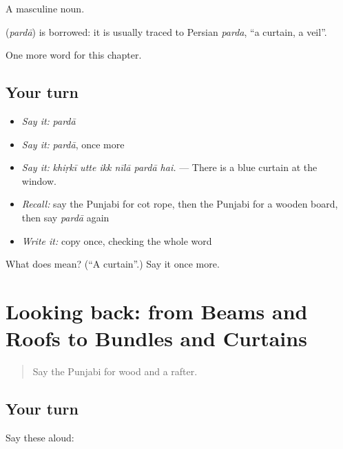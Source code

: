 A masculine noun.

\begin{cousinweb}
\textbf{} (\emph{pardā}) is borrowed: it is usually traced to Persian \emph{parda}, \textquotedblleft{}a curtain, a veil\textquotedblright{}.
\end{cousinweb}

\begin{grammarlens}[title={What you've built}]
One more word for this chapter.
\end{grammarlens}

\subsection*{Your turn}
\begin{itemize}
\raggedright
  \item \emph{Say it:} \emph{pardā}
  \item \emph{Say it:} \emph{pardā}, once more
  \item \emph{Say it:} \emph{khiṛkī utte ikk nīlā pardā hai.} — There is a blue curtain at the window.
  \item \emph{Recall:} say the Punjabi for cot rope, then the Punjabi for a wooden board, then say \emph{pardā} again
  \item \emph{Write it:} copy \textbf{} once, checking the whole word
\end{itemize}

\begin{tcolorbox}[breakable,colback=teal!4,colframe=teal!35!black,title={Before you move on}]
What does  mean? (\textquotedblleft{}A curtain\textquotedblright{}.) Say it once more.
\end{tcolorbox}
\section[(dialogue)]{Looking back: from Beams and Roofs to Bundles and Curtains}

\label{lesson:PA-R252-review-246-252}



\begin{quote}
Say the Punjabi for wood and a rafter.
\end{quote}

\subsection*{Your turn}
Say these aloud:

